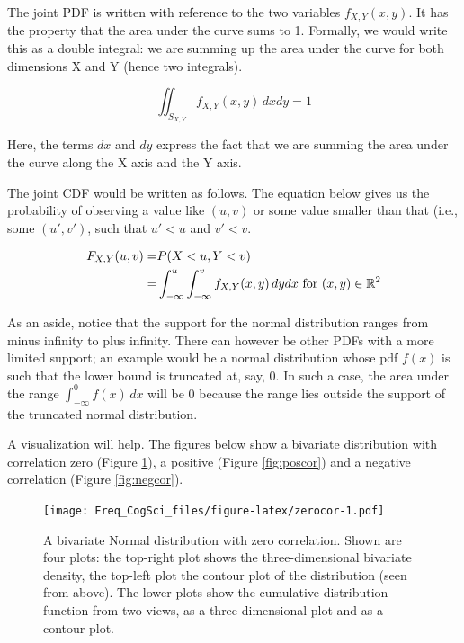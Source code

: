\documentclass[12pt,]{krantz}
\begin{document}
The joint PDF is written with reference to the two variables \(f_{X,Y}(x,y)\). It has the property that the area under the curve sums to 1. Formally, we would write this as a double integral: we are summing up the area under the curve for both dimensions X and Y (hence two integrals).

\begin{equation}
\iint_{S_{X,Y}} f_{X,Y}(x,y)\, dx dy = 1
\end{equation}

Here, the terms \(dx\) and \(dy\) express the fact that we are summing the area under the curve along the X axis and the Y axis.

The joint CDF would be written as follows. The equation below gives us the probability of observing a value like \((u,v)\) or some value smaller than that (i.e., some \((u',v')\), such that \(u'<u\) and \(v'<v\).

\begin{equation}
\begin{split}
F_{X,Y}(u,v) =& P(X<u,Y<v)\\
             =& \int_{-\infty}^u \int_{-\infty}^v f_{X,Y}(x,y)\, dy dx \hbox{ for } (x,y)\in \mathbb{R}^2\\
\end{split}
\end{equation}

As an aside, notice that the support for the normal distribution ranges from minus infinity to plus infinity. There can however be other PDFs with a more limited support; an example would be a normal distribution whose pdf \(f(x)\) is such that the lower bound is truncated at, say, 0. In such a case, the area under the range \(\int_{-\infty}^0 f(x) \, dx\) will be 0 because the range lies outside the support of the truncated normal distribution.

A visualization will help. The figures below show a bivariate distribution with correlation zero (Figure \ref{fig:zerocor}), a positive (Figure \ref{fig:poscor}) and a negative correlation (Figure \ref{fig:negcor}).

\begin{figure}
\centering
\texttt{[image: Freq\_CogSci\_files/figure-latex/zerocor-1.pdf]}
\caption{\label{fig:zerocor}A bivariate Normal distribution with zero correlation. Shown are four plots: the top-right plot shows the three-dimensional bivariate density, the top-left plot the contour plot of the distribution (seen from above). The lower plots show the cumulative distribution function from two views, as a three-dimensional plot and as a contour plot.}
\end{figure}
\end{document}
